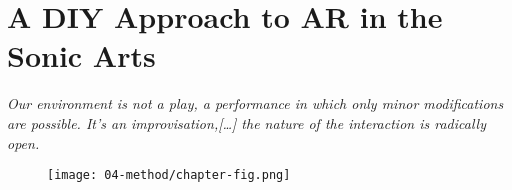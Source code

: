 \chapter{A DIY Approach to AR in the Sonic Arts}
\label{sec: method}
\epigraph{\emph{Our environment is not a play, a performance in which only minor modifications are possible. It's an improvisation,[…] the nature of the interaction is radically open.}}{\citep{vermeulen2015}}

\begin{figure}
    \centering
    \texttt{[image: 04-method/chapter-fig.png]}
    \captionsetup{labelformat=empty}
    \caption[\autoref{sec: method}: Photographs from the Embodiment Hackathon at Sussex, April 30th - May 1st, (from \citeauthor{bonarjee2022}, \citeyear{bonarjee2022})]{}
\end{figure}

\clearpage
